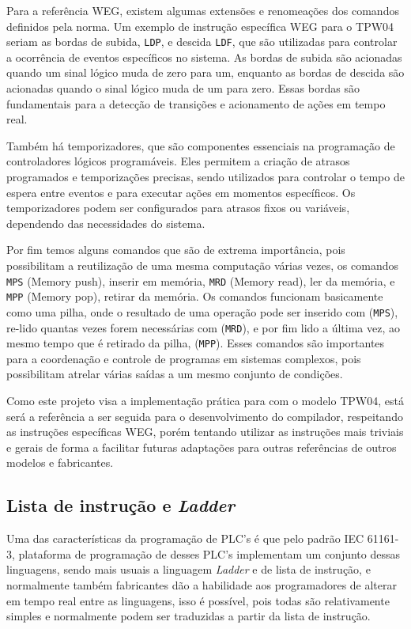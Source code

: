 Para a referência WEG, existem algumas extensões e renomeações dos comandos definidos pela norma. Um exemplo de instrução específica WEG para o TPW04 seriam as bordas de subida, \lstinline{LDP}, e descida \lstinline{LDF}, que são utilizadas para controlar a ocorrência de eventos específicos no sistema. As bordas de subida são acionadas quando um sinal lógico muda de zero para um, enquanto as bordas de descida são acionadas quando o sinal lógico muda de um para zero. Essas bordas são fundamentais para a detecção de transições e acionamento de ações em tempo real.

Também há temporizadores, que são componentes essenciais na programação de controladores lógicos programáveis. Eles permitem a criação de atrasos programados e temporizações precisas, sendo utilizados para controlar o tempo de espera entre eventos e para executar ações em momentos específicos. Os temporizadores podem ser configurados para atrasos fixos ou variáveis, dependendo das necessidades do sistema.

Por fim temos alguns comandos que são de extrema importância, pois possibilitam a reutilização de uma mesma computação várias vezes, os comandos \lstinline{MPS} (Memory push), inserir em memória, \lstinline{MRD} (Memory read), ler da memória, e \lstinline{MPP} (Memory pop), retirar da memória. Os comandos funcionam basicamente como uma pilha, onde o resultado de uma operação pode ser inserido com (\lstinline{MPS}), re-lido quantas vezes forem necessárias com (\lstinline{MRD}), e por fim lido a última vez, ao mesmo tempo que é retirado da pilha, (\lstinline{MPP}). Esses comandos são importantes para a coordenação e controle de programas em sistemas complexos, pois possibilitam atrelar várias saídas a um mesmo conjunto de condições.

Como este projeto visa a implementação prática para com o modelo TPW04, está será a referência a ser seguida para o desenvolvimento do compilador, respeitando as instruções específicas WEG, porém tentando utilizar as instruções mais triviais e gerais de forma a facilitar futuras adaptações para outras referências de outros modelos e fabricantes.

\subsection{Lista de instrução e \textit{Ladder}}

Uma das características da programação de PLC's é que pelo padrão IEC 61161-3, plataforma de programação de desses PLC's implementam um conjunto dessas linguagens, sendo mais usuais a linguagem \textit{Ladder} e de lista de instrução, e normalmente também fabricantes dão a habilidade aos programadores de alterar em tempo real entre as linguagens, isso é possível, pois todas são relativamente simples e normalmente podem ser traduzidas a partir da lista de instrução.

